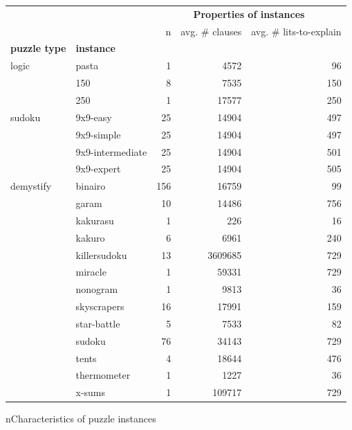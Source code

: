 \documentclass[twoside,11pt]{article}
\begin{document}
\begin{table}[!h]\centering
\begin{tabular}{llrrr}
		\toprule
		&              &  \multicolumn{3}{c}{\textbf{Properties of instances}} \\
&              &  n &  avg. $\#$ {clauses} &  avg. $\#$ lits-to-explain\\
\textbf{puzzle type} & \textbf{instance} &              &          &                      \\
\midrule
	logic & pasta &    1 &           4572 &                    96 \\
& 150 &    8 &           7535 &                   150 \\
& 250 &    1 &          17577 &                   250 \\\hline
	sudoku & 9x9-easy &   25 &          14904 &                   497 \\
& 9x9-simple &   25 &          14904 &                   497 \\
& 9x9-intermediate &   25 &          14904 &                   501 \\
& 9x9-expert &   25 &          14904 &                   505 \\\hline
	demystify & binairo &  156 &          16759 &                    99 \\
	& garam &   10 &          14486 &                   756 \\
	& kakurasu &    1 &            226 &                    16 \\
	& kakuro &    6 &           6961 &                   240 \\
	& killersudoku &   13 &        3609685 &                   729 \\
	& miracle &    1 &          59331 &                   729 \\
	& nonogram &    1 &           9813 &                    36 \\
	& skyscrapers &   16 &          17991 &                   159 \\
	& star-battle &    5 &           7533 &                    82 \\
	& sudoku &   76 &          34143 &                   729 \\
	& tents &    4 &          18644 &                   476 \\
	& thermometer &    1 &           1227 &                    36 \\
	& x-sums &    1 &         109717 &                   729 \\
	\bottomrule
\end{tabular}
n{Characteristics of puzzle instances}
\label{tab:puzzle-composition-family}
\end{table}


\end{document}
